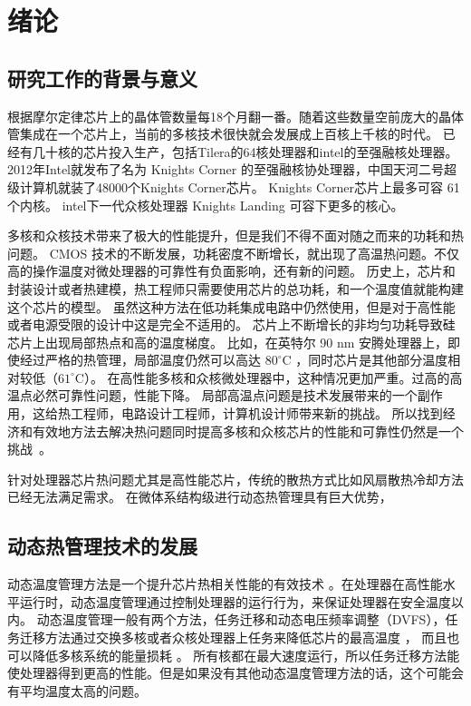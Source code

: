 
\chapter{绪论}
\section{研究工作的背景与意义}\label{sec:mean}
根据摩尔定律芯片上的晶体管数量每18个月翻一番。随着这些数量空前庞大的晶体管集成在一个芯片上，当前的多核技术很快就会发展成上百核上千核的时代\cite{borkar:DAC'07}。
已经有几十核的芯片投入生产，包括Tilera的64核处理器和intel的至强融核处理器。2012年Intel就发布了名为 Knights Corner 的至强融核协处理器，中国天河二号超级计算机就装了48000个Knights Corner芯片。
Knights Corner芯片上最多可容 61个内核。
intel下一代众核处理器 Knights Landing 可容下更多的核心。


多核和众核技术带来了极大的性能提升，但是我们不得不面对随之而来的功耗和热问题。
CMOS 技术的不断发展，功耗密度不断增长，就出现了高温热问题。不仅高的操作温度对微处理器的可靠性有负面影响，还有新的问题。
历史上，芯片和封装设计或者热建模，热工程师只需要使用芯片的总功耗，和一个温度值就能构建这个芯片的模型。
虽然这种方法在低功耗集成电路中仍然使用，但是对于高性能或者电源受限的设计中这是完全不适用的。
芯片上不断增长的非均匀功耗导致硅芯片上出现局部热点和高的温度梯度。
比如，在英特尔 90 nm 安腾处理器上，即使经过严格的热管理，局部温度仍然可以高达 $80 ^\circ$C ，同时芯片是其他部分温度相对较低（$61^\circ$C）\cite{mcgowen2006power}。
在高性能多核和众核微处理器中，这种情况更加严重。过高的高温点必然可靠性问题，性能下降。
局部高温点问题是技术发展带来的一个副作用，这给热工程师，电路设计工程师，计算机设计师带来新的挑战。
所以找到经济和有效地方法去解决热问题同时提高多核和众核芯片的性能和可靠性仍然是一个挑战~\cite{Brooks:MICRO'07}。

针对处理器芯片热问题尤其是高性能芯片，传统的散热方式比如风扇散热冷却方法已经无法满足需求。
在微体系结构级进行动态热管理具有巨大优势，

\section{动态热管理技术的发展}\label{sec:his}

动态温度管理方法是一个提升芯片热相关性能的有效技术 \cite{Donald:ISCA'06}。在处理器在高性能水平运行时，动态温度管理通过控制处理器的运行行为，来保证处理器在安全温度以内。
动态温度管理一般有两个方法，任务迁移和动态电压频率调整（DVFS），任务迁移方法通过交换多核或者众核处理器上任务来降低芯片的最高温度 \cite{Powell:ASPLOS'04,Ge:DAC'10,Chantem:TVLSI'11,Liu:DATE'12,Ayoub:ISLPED'09,Ebi:ICCAD'09} ，
而且也可以降低多核系统的能量损耗 \cite{Cong:ISLPED'12}。
所有核都在最大速度运行，所以任务迁移方法能使处理器得到更高的性能。但是如果没有其他动态温度管理方法的话，这个可能会有平均温度太高的问题。

